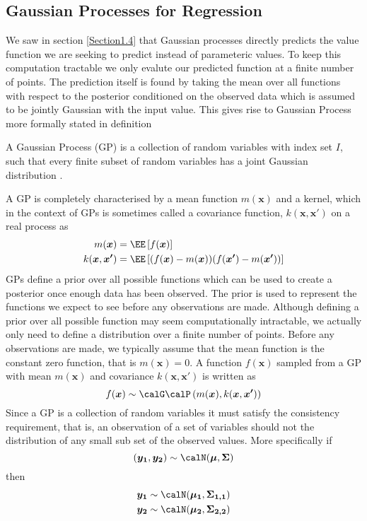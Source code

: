 \subsection{Gaussian Processes for Regression}\label{Section1.5}

We saw in section \ref{Section1.4} that Gaussian processes directly predicts the value function we are seeking to predict instead of parameteric values. To keep this computation tractable we only evalute our predicted function at a finite number of points. The prediction itself is found by taking the mean over all functions with respect to the posterior conditioned on the observed data which is assumed to be jointly Gaussian with the input value. This gives rise to Gaussian Process more formally stated in definition

\begin{defe} \label{defe: GP}
    A Gaussian Process (GP) is a collection of random variables with index set $I$, such that every finite subset of random variables has a joint Gaussian distribution \cite{RasmussenCarlEdward2006Gpfm,MurphyKevinP2012Ml}.
\end{defe}

A GP is completely characterised by a mean function $m(\bm{x})$ and a kernel, which in the context of GPs is sometimes called a covariance function, $k (\bm{x}, \bm{x'})$ on a real process as
\begin{align*}
    m(\bm{x})           & = \EE \left[ f(\bm{x}) \right]                                         \\
    k (\bm{x}, \bm{x'}) & = \EE \left[ (f(\bm{x}) - m(\bm{x})) (f(\bm{x'}) - m(\bm{x'})) \right]
\end{align*}
GPs define a prior over all possible functions which can be used to create a posterior once enough data has been observed. The prior is used to represent the functions we expect to see before any observations are made. Although defining a prior over all possible function may seem computationally intractable, we actually only need to define a distribution over a finite number of points. Before any observations are made, we typically assume that the mean function is the constant zero function, that is $m \left( \bm{x} \right) = 0$. A function $f(\bm{x})$ sampled from a GP with mean $m(\bm{x})$ and covariance $k (\bm{x}, \bm{x'})$ is written as
\[
    f(\bm{x}) \sim \calG \calP \left( m(\bm{x}), k (\bm{x}, \bm{x'}) \right)
\]
Since a GP is a collection of random variables it must satisfy the consistency requirement, that is, an observation of a set of variables should not the distribution of any small sub set of the observed values. More specifically if
\[
    (\bm{y_1}, \bm{y_2}) \sim \calN (\bm{\mu}, \bm{\Sigma})
\]
then
\begin{align*}
    \bm{y_1} & \sim \calN (\bm{\mu_1}, \bm{\Sigma_{1,1}}) \\
    \bm{y_2} & \sim \calN (\bm{\mu_2}, \bm{\Sigma_{2,2}})
\end{align*}


